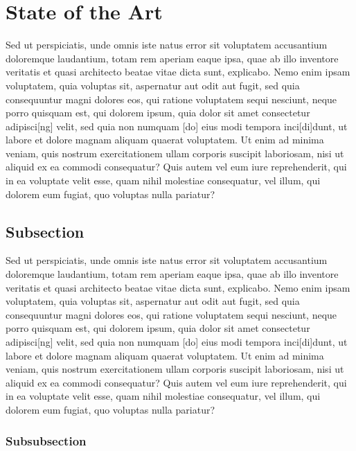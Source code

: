 \documentclass[a4paper,11pt]{article}
\begin{document}
\section{State of the Art}
Sed ut perspiciatis, unde omnis iste natus error sit voluptatem accusantium doloremque laudantium, totam rem aperiam eaque ipsa, quae ab illo inventore veritatis et quasi architecto beatae vitae dicta sunt, explicabo. Nemo enim ipsam voluptatem, quia voluptas sit, aspernatur aut odit aut fugit, sed quia consequuntur magni dolores eos, qui ratione voluptatem sequi nesciunt, neque porro quisquam est, qui dolorem ipsum, quia dolor sit amet consectetur adipisci[ng] velit, sed quia non numquam [do] eius modi tempora inci[di]dunt, ut labore et dolore magnam aliquam quaerat voluptatem. Ut enim ad minima veniam, quis nostrum exercitationem ullam corporis suscipit laboriosam, nisi ut aliquid ex ea commodi consequatur? Quis autem vel eum iure reprehenderit, qui in ea voluptate velit esse, quam nihil molestiae consequatur, vel illum, qui dolorem eum fugiat, quo voluptas nulla pariatur?

\subsection{Subsection}

Sed ut perspiciatis, unde omnis iste natus error sit voluptatem accusantium doloremque laudantium, totam rem aperiam eaque ipsa, quae ab illo inventore veritatis et quasi architecto beatae vitae dicta sunt, explicabo. Nemo enim ipsam voluptatem, quia voluptas sit, aspernatur aut odit aut fugit, sed quia consequuntur magni dolores eos, qui ratione voluptatem sequi nesciunt, neque porro quisquam est, qui dolorem ipsum, quia dolor sit amet consectetur adipisci[ng] velit, sed quia non numquam [do] eius modi tempora inci[di]dunt, ut labore et dolore magnam aliquam quaerat voluptatem. Ut enim ad minima veniam, quis nostrum exercitationem ullam corporis suscipit laboriosam, nisi ut aliquid ex ea commodi consequatur? Quis autem vel eum iure reprehenderit, qui in ea voluptate velit esse, quam nihil molestiae consequatur, vel illum, qui dolorem eum fugiat, quo voluptas nulla pariatur?

\subsubsection{Subsubsection}
\end{document}
